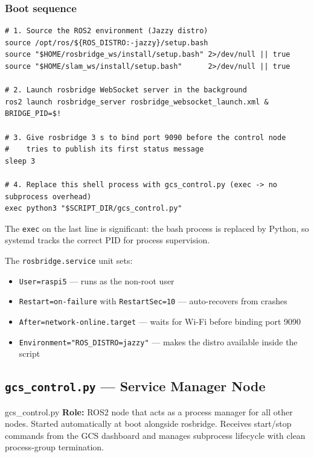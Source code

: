 \documentclass[11pt,a4paper]{article}
\begin{document}
\subsubsection{Boot sequence}

\begin{lstlisting}[style=bash, caption=rosbridge\_boot.sh -- startup sequence]
# 1. Source the ROS2 environment (Jazzy distro)
source /opt/ros/${ROS_DISTRO:-jazzy}/setup.bash
source "$HOME/rosbridge_ws/install/setup.bash" 2>/dev/null || true
source "$HOME/slam_ws/install/setup.bash"      2>/dev/null || true

# 2. Launch rosbridge WebSocket server in the background
ros2 launch rosbridge_server rosbridge_websocket_launch.xml &
BRIDGE_PID=$!

# 3. Give rosbridge 3 s to bind port 9090 before the control node
#    tries to publish its first status message
sleep 3

# 4. Replace this shell process with gcs_control.py (exec -> no subprocess overhead)
exec python3 "$SCRIPT_DIR/gcs_control.py"
\end{lstlisting}

The \texttt{exec} on the last line is significant: the bash process is replaced
by Python, so systemd tracks the correct PID for process supervision.

The \texttt{rosbridge.service} unit sets:
\begin{itemize}
  \item \texttt{User=raspi5} — runs as the non-root user
  \item \texttt{Restart=on-failure} with \texttt{RestartSec=10} — auto-recovers from crashes
  \item \texttt{After=network-online.target} — waits for Wi-Fi before binding port 9090
  \item \texttt{Environment="ROS\_DISTRO=jazzy"} — makes the distro available inside the script
\end{itemize}

\subsection{\texttt{gcs\_control.py} — Service Manager Node}

\begin{filebox}{gcs\_control.py}
\textbf{Role:} ROS2 node that acts as a process manager for all other nodes.
Started automatically at boot alongside rosbridge.
Receives start/stop commands from the GCS dashboard and manages subprocess
lifecycle with clean process-group termination.
\end{filebox}
\end{document}
